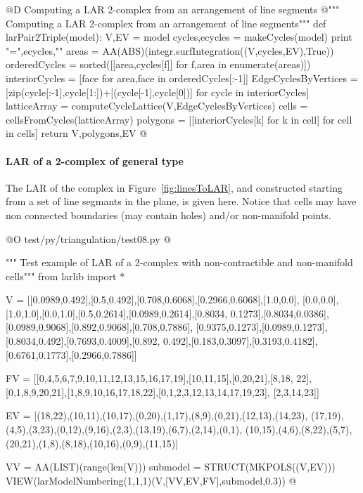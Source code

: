 \documentclass[11pt,oneside]{article}    %
\begin{document}
@D Computing a LAR 2-complex from an arrangement of line segments
@{""" Computing a LAR 2-complex from an arrangement of line segments"""
def larPair2Triple(model):
    V,EV = model
    cycles,ecycles = makeCycles(model)
    print "\necycles =",ecycles,"\n"
    areas = AA(ABS)(integr.surfIntegration((V,cycles,EV),True))
    orderedCycles = sorted([[area,cycles[f]] for f,area in enumerate(areas)])
    interiorCycles = [face for area,face in orderedCycles[:-1]]
    EdgeCyclesByVertices = [zip(cycle[:-1],cycle[1:])+[(cycle[-1],cycle[0])] 
                                for cycle in interiorCycles]
    latticeArray = computeCycleLattice(V,EdgeCyclesByVertices)
    cells = cellsFromCycles(latticeArray)
    polygons = [[interiorCycles[k] for k in cell] for cell in cells]
    return V,polygons,EV
@}



\paragraph{LAR of a 2-complex of general type}

The LAR of the complex in Figure~\ref{fig:linesToLAR}, and constructed starting from a set of line segmants in the plane, is given here. Notice that cells may have non connected boundaries (may contain holes) and/or non-manifold points.

@O test/py/triangulation/test08.py
@{""" Test example of LAR of a 2-complex with non-contractible and non-manifold cells"""
from larlib import *

V = [[0.0989,0.492],[0.5,0.492],[0.708,0.6068],[0.2966,0.6068],[1.0,0.0], 
[0.0,0.0],[1.0,1.0],[0.0,1.0],[0.5,0.2614],[0.0989,0.2614],[0.8034,
0.1273],[0.8034,0.0386],[0.0989,0.9068],[0.892,0.9068],[0.708,0.7886],
[0.9375,0.1273],[0.0989,0.1273],[0.8034,0.492],[0.7693,0.4009],[0.892,
0.492],[0.183,0.3097],[0.3193,0.4182],[0.6761,0.1773],[0.2966,0.7886]]

FV = [[0,4,5,6,7,9,10,11,12,13,15,16,17,19],[10,11,15],[0,20,21],[8,18,
22], [0,1,8,9,20,21],[1,8,9,10,16,17,18,22],[0,1,2,3,12,13,14,17,19,23],
[2,3,14,23]]

EV = [(18,22),(10,11),(10,17),(0,20),(1,17),(8,9),(0,21),(12,13),(14,23), 
(17,19),(4,5),(3,23),(0,12),(9,16),(2,3),(13,19),(6,7),(2,14),(0,1),
(10,15),(4,6),(8,22),(5,7),(20,21),(1,8),(8,18),(10,16),(0,9),(11,15)]

VV = AA(LIST)(range(len(V)))
submodel = STRUCT(MKPOLS((V,EV)))        
VIEW(larModelNumbering(1,1,1)(V,[VV,EV,FV],submodel,0.3)) 
@}
\end{document}
